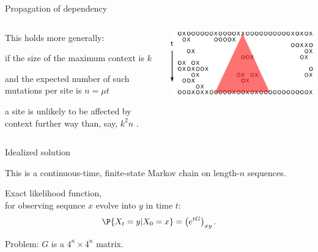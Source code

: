 \documentclass[smaller]{beamer}
\begin{document}
\begin{frame}{Propagation of dependency}

  \begin{columns}[c]
    \begin{column}{.5\textwidth}

      This holds more generally:

      \vspace{1em}

      if the size of the maximum context is $k$

      \vspace{1em}

      and the expected number of such mutations per site is $n = \mu t$

      \vspace{1em}

      a site is unlikely to be affected by context further way than, say, $k^2 n$ .

    \end{column}
    \begin{column}{.5\textwidth}

      \includegraphics[width=\textwidth]{../../../writeup-plots/talk-tasep-fig-3}

    \end{column}
  \end{columns}

\end{frame}



\begin{frame}{Idealized solution}

  This is a continuous-time, finite-state Markov chain on length-$n$ sequences.
  
  \vspace{1em}

  Exact likelihood function, \\
  for observing sequnce $x$ evolve into $y$ in time $t$:
  \begin{align*}
    \P\{ X_t = y | X_0 = x \} = \left( e^{tG} \right)_{xy} .
  \end{align*}

  \vspace{1em}

  {\newthing Problem:} $G$ is a $4^n \times 4^n$ matrix.

\end{frame}
\end{document}
